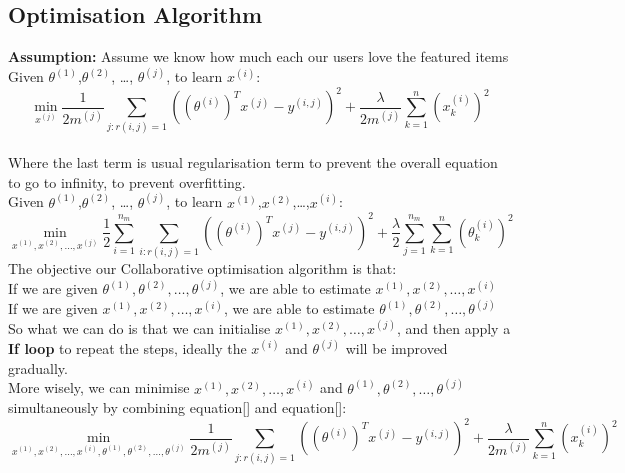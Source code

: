 \subsection*{Optimisation Algorithm}
\textbf{Assumption:} Assume we know how much each our users love the featured items
\\Given $\theta^{(1)}$,$\theta^{(2)}$, \dots, $\theta^{(j)}$, to learn $x^{(i)}$:
\begin{equation*}
\min_{x^{(j)}} \frac{1}{2m^{(j)}}\sum_{j:r(i,j) = 1}\left((\theta^{(i)})^{T}x^{(j)}-y^{(i,j)}\right)^{2} + \frac{\lambda}{2m^{(j)}}\sum_{k = 1}^{n}(x^{(i)}_{k})^{2}
\end{equation*}
\\Where the last term is usual regularisation term to prevent the overall equation to go to infinity, to prevent overfitting.
\\Given $\theta^{(1)}$,$\theta^{(2)}$, \dots, $\theta^{(j)}$, to learn $x^{(1)}$,$x^{(2)}$,\dots,$x^{(i)}$:
\begin{equation*}
\min_{x^{(1)},x^{(2)}, \dots,x^{(j)}} \frac{1}{2}\sum_{i = 1}^{n_{m}}\sum_{i:r(i,j) = 1}\left((\theta^{(i)})^{T}x^{(j)}-y^{(i,j)}\right)^{2} + \frac{\lambda}{2}\sum_{j = 1}^{n_{m}}\sum_{k = 1}^{n}(\theta^{(i)}_{k})^{2}
\end{equation*}
The objective our Collaborative optimisation algorithm is that:
\\ If we are given $\theta^{(1)},\theta^{(2)}, \dots, \theta^{(j)}$, we are able to estimate $x^{(1)},x^{(2)}, \dots,x^{(i)}$
\\  If we are given $x^{(1)},x^{(2)}, \dots,x^{(i)}$, we are able to estimate $\theta^{(1)},\theta^{(2)}, \dots, \theta^{(j)}$
\\ So what we can do is that we can initialise $x^{(1)},x^{(2)}, \dots,x^{(j)}$, and then apply a \textbf{If loop} to repeat the steps, ideally the $x^{(i)}$ and $\theta^{(j)}$ will be improved gradually. 
\\ More wisely, we can minimise $x^{(1)},x^{(2)}, \dots,x^{(i)}$ and $\theta^{(1)},\theta^{(2)}, \dots, \theta^{(j)}$ simultaneously by combining equation[] and equation[]:
\begin{equation*}
\min_{x^{(1)},x^{(2)}, \dots,x^{(i)}, \theta^{(1)},\theta^{(2)}, \dots, \theta^{(j)} } \frac{1}{2m^{(j)}}
\sum_{j:r(i,j) = 1}\left((\theta^{(i)})^{T}x^{(j)}-y^{(i,j)}\right)^{2} + 
\frac{\lambda}{2m^{(j)}}
\sum_{k = 1}^{n}(x^{(i)}_{k})^{2}
\end{equation*}






